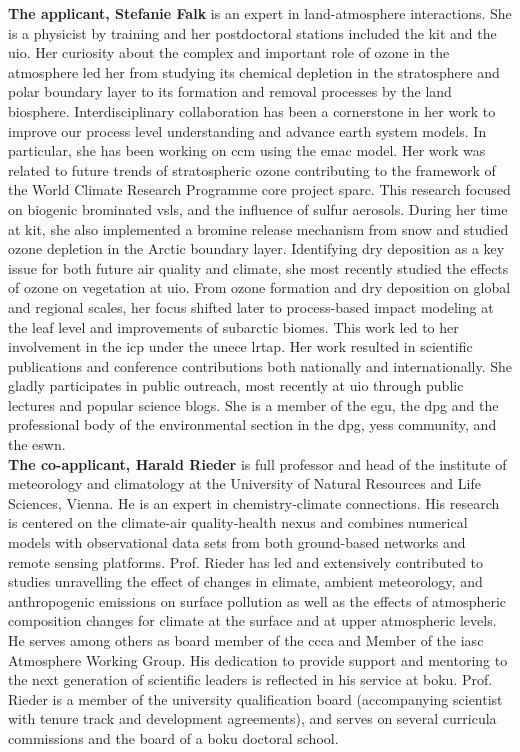 \textbf{The applicant, Stefanie Falk} is an expert in land-atmosphere interactions. She is a physicist by training and her postdoctoral stations included the \gls{kit} and the \gls{uio}. Her curiosity about the complex and important role of ozone in the atmosphere led her from studying its chemical depletion in the stratosphere and polar boundary layer to its formation and removal processes by the land biosphere. Interdisciplinary collaboration has been a cornerstone in her work to improve our process level understanding and advance earth system models. In particular, she has been working on \gls{ccm} using the \gls{emac} model. Her work was related to future trends of stratospheric ozone contributing to the framework of the World Climate Research Programme core project \gls{sparc}. This research focused on biogenic brominated \gls{vsls}, and the influence of sulfur aerosols. During her time at \gls{kit}, she also implemented a bromine release mechanism from snow and studied ozone depletion in the Arctic boundary layer. Identifying dry deposition as a key issue for both future air quality and climate, she most recently studied the effects of ozone on vegetation at \gls{uio}. From ozone formation and dry deposition on global and regional scales, her focus shifted later to process-based impact modeling at the leaf level and improvements of subarctic biomes. This work led to her involvement in the \gls{icp} under the \gls{unece} \gls{lrtap}. Her work resulted in scientific publications and conference contributions both nationally and internationally. She gladly participates in public outreach, most recently at \gls{uio} through public lectures and popular science blogs. She is a member of the \gls{egu}, the \gls{dpg} and the professional body of the environmental section in the \gls{dpg}, \gls{yess} community, and the \gls{eswn}.\\

\textbf{The co-applicant, Harald Rieder} is full professor and head of the institute of meteorology and climatology at the University of Natural Resources and Life Sciences, Vienna. He is an expert in chemistry-climate connections. His research is centered on the climate-air quality-health nexus and combines numerical models with observational data sets from both ground-based networks and remote sensing platforms. Prof. Rieder has led and extensively contributed to studies unravelling the effect of changes in climate, ambient meteorology, and anthropogenic emissions on surface pollution as well as the effects of atmospheric composition changes for climate at the surface and at upper atmospheric levels. He serves among others as board member of the \gls{ccca} and Member of the \gls{iasc} Atmosphere Working Group. His dedication to provide support and mentoring to the next generation of scientific leaders is reflected in his service at \gls{boku}. Prof. Rieder is a member of the university qualification board (accompanying scientist with tenure track and development agreements), and serves on several curricula commissions and the board of a \gls{boku} doctoral school. 
